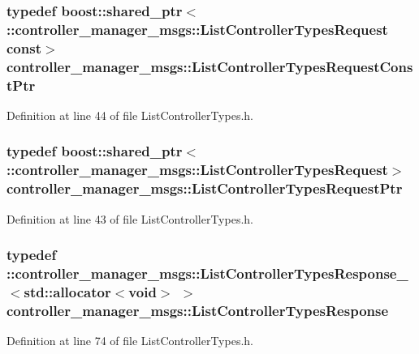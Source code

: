 \subsubsection[{\-List\-Controller\-Types\-Request\-Const\-Ptr}]{\setlength{\rightskip}{0pt plus 5cm}typedef boost\-::shared\-\_\-ptr$<$ \-::{\bf controller\-\_\-manager\-\_\-msgs\-::\-List\-Controller\-Types\-Request} const$>$ {\bf controller\-\_\-manager\-\_\-msgs\-::\-List\-Controller\-Types\-Request\-Const\-Ptr}}\label{namespacecontroller__manager__msgs_a12c26741d1fc85c2e2f03c8d31e01e70}


\-Definition at line 44 of file \-List\-Controller\-Types.\-h.

\subsubsection[{\-List\-Controller\-Types\-Request\-Ptr}]{\setlength{\rightskip}{0pt plus 5cm}typedef boost\-::shared\-\_\-ptr$<$ \-::{\bf controller\-\_\-manager\-\_\-msgs\-::\-List\-Controller\-Types\-Request}$>$ {\bf controller\-\_\-manager\-\_\-msgs\-::\-List\-Controller\-Types\-Request\-Ptr}}\label{namespacecontroller__manager__msgs_a3ba1545012a7d8f81934ddc5054bf33c}


\-Definition at line 43 of file \-List\-Controller\-Types.\-h.

\subsubsection[{\-List\-Controller\-Types\-Response}]{\setlength{\rightskip}{0pt plus 5cm}typedef \-::{\bf controller\-\_\-manager\-\_\-msgs\-::\-List\-Controller\-Types\-Response\-\_\-}$<$std\-::allocator$<$void$>$ $>$ {\bf controller\-\_\-manager\-\_\-msgs\-::\-List\-Controller\-Types\-Response}}\label{namespacecontroller__manager__msgs_ad4692c1f4fd6c58aa6379f4e8026e703}


\-Definition at line 74 of file \-List\-Controller\-Types.\-h.

